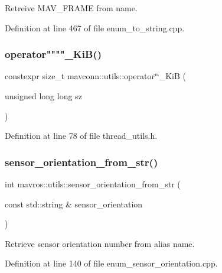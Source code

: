 Retreive M\+A\+V\+\_\+\+F\+R\+A\+ME from name. 



Definition at line 467 of file enum\+\_\+to\+\_\+string.\+cpp.

\mbox{\label{group__mavutils_ga301ff0ee568776aa543ccaff3c1c039c}} 
\subsubsection{\texorpdfstring{operator""""\_KiB()}{operator""\_KiB()}}
{\footnotesize\ttfamily constexpr size\+\_\+t mavconn\+::utils\+::operator\char`\"{}\char`\"{}\+\_\+\+KiB (\begin{DoxyParamCaption}\item[{unsigned long long}]{sz }\end{DoxyParamCaption})\hspace{0.3cm}{\ttfamily [constexpr]}}



Definition at line 78 of file thread\+\_\+utils.\+h.

\mbox{\label{group__mavutils_ga0dc70c024ad33cd50af1c9e9bcfaa0c1}} 
\subsubsection{\texorpdfstring{sensor\_orientation\_from\_str()}{sensor\_orientation\_from\_str()}}
{\footnotesize\ttfamily int mavros\+::utils\+::sensor\+\_\+orientation\+\_\+from\+\_\+str (\begin{DoxyParamCaption}\item[{const std\+::string \&}]{sensor\+\_\+orientation }\end{DoxyParamCaption})}



Retrieve sensor orientation number from alias name. 



Definition at line 140 of file enum\+\_\+sensor\+\_\+orientation.\+cpp.

\mbox{\label{group__mavutils_ga9f21cd4e0233c34591600f8809c4fb2b}} 
